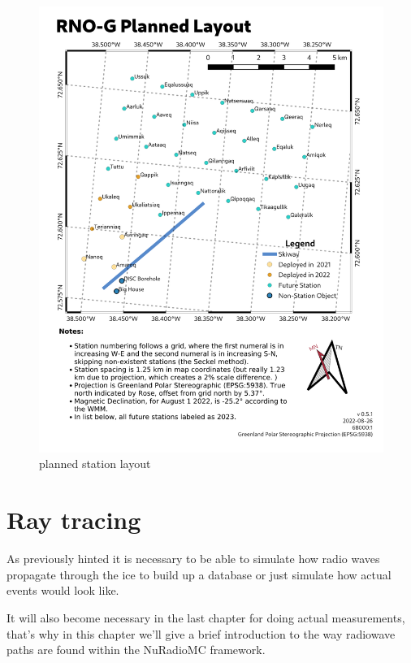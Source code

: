 \documentclass[11pt,a4paper,faculty=we,language=en,doctype=report]{cls/ugent-doc}
\begin{document}
\begin{figure}
	\includegraphics[width=\textwidth]{figures/station-map.png}	
	\caption{planned station layout}
	\label{fig:station map}
\end{figure}

\chapter{Ray tracing}
As previously hinted it is necessary to be able to simulate how radio waves
propagate through the ice to build up a database or just simulate how actual
events would look like.

It will also become necessary in the last chapter for doing actual measurements,
that's why in this chapter we'll give a brief introduction to the way radiowave
paths are found within the NuRadioMC framework.
\end{document}
